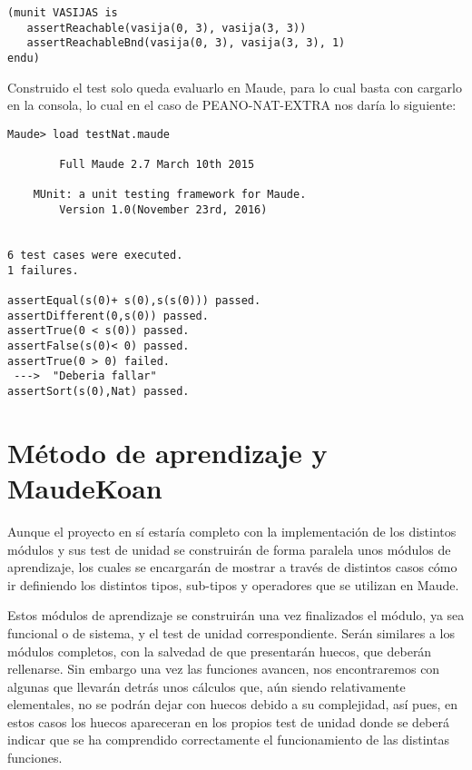 {\codesize
\begin{verbatim}
(munit VASIJAS is
   assertReachable(vasija(0, 3), vasija(3, 3))
   assertReachableBnd(vasija(0, 3), vasija(3, 3), 1)
endu)
\end{verbatim}
}

Construido el test solo queda evaluarlo en Maude, para lo cual basta con cargarlo en la consola, lo cual en el caso de PEANO-NAT-EXTRA nos daría lo siguiente:\par

{\codesize
\begin{verbatim}
Maude> load testNat.maude

	    Full Maude 2.7 March 10th 2015

	MUnit: a unit testing framework for Maude.
		Version 1.0(November 23rd, 2016)


6 test cases were executed.
1 failures.

assertEqual(s(0)+ s(0),s(s(0))) passed.
assertDifferent(0,s(0)) passed.
assertTrue(0 < s(0)) passed.
assertFalse(s(0)< 0) passed.
assertTrue(0 > 0) failed.
 --->  "Deberia fallar"
assertSort(s(0),Nat) passed.
\end{verbatim}
}

\section{Método de aprendizaje y MaudeKoan}

Aunque el proyecto en sí estaría completo con la implementación de los distintos módulos y sus test de unidad se construirán de forma paralela unos módulos de aprendizaje, los cuales se encargarán de mostrar a través de distintos casos cómo ir definiendo los distintos tipos, sub-tipos y operadores que se utilizan en Maude.\par

Estos módulos de aprendizaje se construirán una vez finalizados el módulo, ya sea funcional o de sistema, y el test de unidad correspondiente. Serán similares a los módulos completos, con la salvedad de que presentarán huecos, que deberán rellenarse. Sin embargo una vez las funciones avancen, nos encontraremos con algunas que llevarán detrás unos cálculos que, aún siendo relativamente elementales, no se podrán dejar con huecos debido a su complejidad, así pues, en estos casos los huecos apareceran en los propios test de unidad donde se deberá indicar que se ha comprendido correctamente el funcionamiento de las distintas funciones. \par

